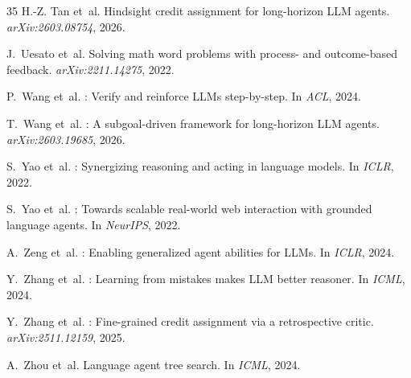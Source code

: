 \documentclass[11pt]{article}
\begin{document}
\begin{thebibliography}{35}
H.-Z. Tan et~al.
\newblock Hindsight credit assignment for long-horizon {LLM} agents.
\newblock \emph{arXiv:2603.08754}, 2026.

J.~Uesato et~al.
\newblock Solving math word problems with process- and outcome-based feedback.
\newblock \emph{arXiv:2211.14275}, 2022.

P.~Wang et~al.
: Verify and reinforce {LLMs} step-by-step.
\newblock In \emph{ACL}, 2024.

T.~Wang et~al.
: A subgoal-driven framework for long-horizon {LLM} agents.
\newblock \emph{arXiv:2603.19685}, 2026.

S.~Yao et~al.
: Synergizing reasoning and acting in language models.
\newblock In \emph{ICLR}, 2022.

S.~Yao et~al.
: Towards scalable real-world web interaction with grounded language agents.
\newblock In \emph{NeurIPS}, 2022.

A.~Zeng et~al.
: Enabling generalized agent abilities for {LLMs}.
\newblock In \emph{ICLR}, 2024.

Y.~Zhang et~al.
: Learning from mistakes makes {LLM} better reasoner.
\newblock In \emph{ICML}, 2024.

Y.~Zhang et~al.
: Fine-grained credit assignment via a retrospective critic.
\newblock \emph{arXiv:2511.12159}, 2025.

A.~Zhou et~al.
\newblock Language agent tree search.
\newblock In \emph{ICML}, 2024.

\end{thebibliography}
\end{document}
